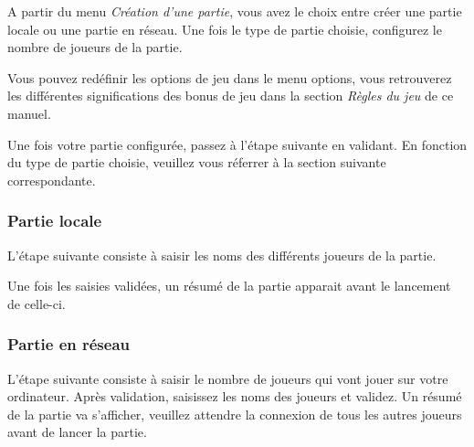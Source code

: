 	A partir du menu \textit{Création d'une partie}, vous avez le choix entre créer une partie locale ou une partie en réseau.
Une fois le type de partie choisie, configurez le nombre de joueurs de la partie. 


Vous pouvez redéfinir les options de jeu dans le menu options, vous retrouverez les différentes significations des bonus de jeu dans la section \textit{Règles du jeu} de ce manuel.


Une fois votre partie configurée, passez à l'étape suivante en validant. En fonction du type de partie choisie, veuillez vous réferrer à la section suivante correspondante.

	\subsubsection{Partie locale}
		L'étape suivante consiste à saisir les noms des différents joueurs de la partie. 
		
		Une fois les saisies validées, un résumé de la partie apparait avant le lancement de celle-ci.
		
	\subsubsection{Partie en réseau}
		L'étape suivante consiste à saisir le nombre de joueurs qui vont jouer sur votre ordinateur.
		Après validation, saisissez les noms des joueurs et validez.
		Un résumé de la partie va s'afficher, veuillez attendre la connexion de tous les autres joueurs avant de lancer la partie.
		

